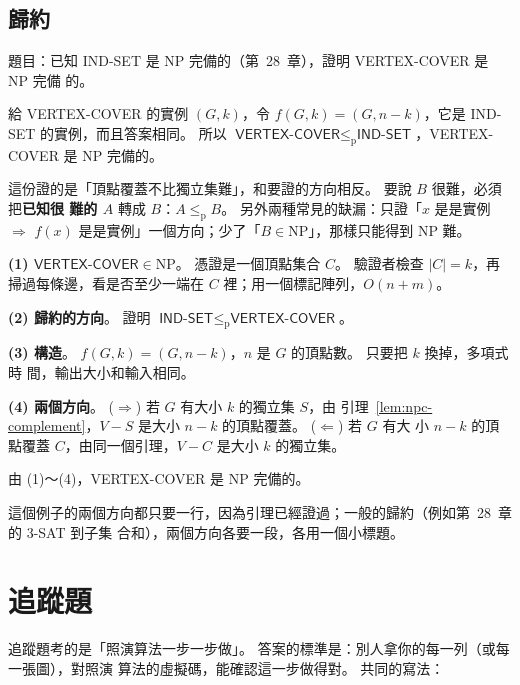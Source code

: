 \subsection{歸約}

題目：已知 \textsf{IND-SET} 是 NP 完備的（第~28~章），證明 \textsf{VERTEX-COVER} 是 NP 完備
的。

\begin{exmbad}[方向反了]
給 \textsf{VERTEX-COVER} 的實例 $(G, k)$，令 $f(G, k) = (G, n - k)$，它是
\textsf{IND-SET} 的實例，而且答案相同。 所以 $\textsf{VERTEX-COVER} \le_{\mathrm{p}}
\textsf{IND-SET}$，\textsf{VERTEX-COVER} 是 NP 完備的。
\end{exmbad}

這份證的是「頂點覆蓋不比獨立集難」，和要證的方向相反。 要說 $B$ 很難，必須把\textbf{已知很
難的 $A$} 轉成 $B$：$A \le_{\mathrm{p}} B$。 另外兩種常見的缺漏：只證「$x$ 是是實例
$\Rightarrow$ $f(x)$ 是是實例」一個方向；少了「$B \in \mathrm{NP}$」，那樣只能得到 NP 難。

\begin{exmgood}
\textbf{(1) $\textsf{VERTEX-COVER} \in \mathrm{NP}$}。 憑證是一個頂點集合 $C$。 驗證者檢查
$|C| = k$，再掃過每條邊，看是否至少一端在 $C$ 裡；用一個標記陣列，$O(n + m)$。

\textbf{(2) 歸約的方向}。 證明 $\textsf{IND-SET} \le_{\mathrm{p}} \textsf{VERTEX-COVER}$。

\textbf{(3) 構造}。 $f(G, k) = (G, n - k)$，$n$ 是 $G$ 的頂點數。 只要把 $k$ 換掉，多項式時
間，輸出大小和輸入相同。

\textbf{(4) 兩個方向}。 ($\Rightarrow$) 若 $G$ 有大小 $k$ 的獨立集 $S$，由
引理~\ref{lem:npc-complement}，$V - S$ 是大小 $n - k$ 的頂點覆蓋。 ($\Leftarrow$) 若 $G$ 有大
小 $n - k$ 的頂點覆蓋 $C$，由同一個引理，$V - C$ 是大小 $k$ 的獨立集。

由 (1)～(4)，\textsf{VERTEX-COVER} 是 NP 完備的。
\end{exmgood}

這個例子的兩個方向都只要一行，因為引理已經證過；一般的歸約（例如第~28~章的 3-SAT 到子集
合和），兩個方向各要一段，各用一個小標題。

\section{追蹤題}
\label{sec:exm-trace}

追蹤題考的是「照演算法一步一步做」。 答案的標準是：別人拿你的每一列（或每一張圖），對照演
算法的虛擬碼，能確認這一步做得對。 共同的寫法：

